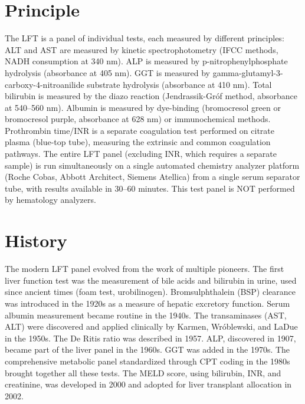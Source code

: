 \section*{Principle}
The LFT is a panel of individual tests, each measured by different principles: ALT and AST are measured by kinetic spectrophotometry (IFCC methods, NADH consumption at 340 nm). ALP is measured by p-nitrophenylphosphate hydrolysis (absorbance at 405 nm). GGT is measured by gamma-glutamyl-3-carboxy-4-nitroanilide substrate hydrolysis (absorbance at 410 nm). Total bilirubin is measured by the diazo reaction (Jendrassik-Gr\'{o}f method, absorbance at 540--560 nm). Albumin is measured by dye-binding (bromocresol green or bromocresol purple, absorbance at 628 nm) or immunochemical methods. Prothrombin time/INR is a separate coagulation test performed on citrate plasma (blue-top tube), measuring the extrinsic and common coagulation pathways. The entire LFT panel (excluding INR, which requires a separate sample) is run simultaneously on a single automated chemistry analyzer platform (Roche Cobas, Abbott Architect, Siemens Atellica) from a single serum separator tube, with results available in 30--60 minutes. This test panel is NOT performed by hematology analyzers.

\section*{History}
The modern LFT panel evolved from the work of multiple pioneers. The first liver function test was the measurement of bile acids and bilirubin in urine, used since ancient times (foam test, urobilinogen). Bromsulphthalein (BSP) clearance was introduced in the 1920s as a measure of hepatic excretory function. Serum albumin measurement became routine in the 1940s. The transaminases (AST, ALT) were discovered and applied clinically by Karmen, Wr\'{o}blewski, and LaDue in the 1950s. The De Ritis ratio was described in 1957. ALP, discovered in 1907, became part of the liver panel in the 1960s. GGT was added in the 1970s. The comprehensive metabolic panel standardized through CPT coding in the 1980s brought together all these tests. The MELD score, using bilirubin, INR, and creatinine, was developed in 2000 and adopted for liver transplant allocation in 2002.

